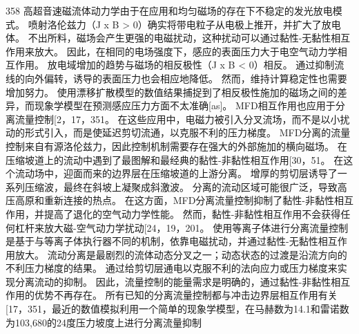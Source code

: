 \documentclass[UTF8,11pt,a4paper,openany,fontset=fandol]{ctexbook}
\begin{document}
358 高超音速磁流体动力学由于在应用和均匀磁场的存在下不稳定的发光放电模式。 喷射洛伦兹力（J x B > 0）确实将带电粒子从电极上推开，并扩大了放电体。 不出所料，磁场会产生更强的电磁扰动，这种扰动可以通过黏性-无黏性相互作用来放大。 因此，在相同的电场强度下，感应的表面压力大于电空气动力学相互作用。 放电域增加的趋势与磁场的相反极性（J x B < 0）相反。 通过抑制流线的向外偏转，诱导的表面压力也会相应地降低。 然而，维持计算稳定性也需要增加努力。 使用漂移扩散模型的数值结果捕捉到了相反极性施加的磁场之间的差异，而现象学模型在预测感应压力方面不太准确[as]。 MFD相互作用也应用于分离流量控制[2，17，351。 在这些应用中，电磁力被引入分叉流场，而不是以小扰动的形式引入，而是使延迟剪切流通，以克服不利的压力梯度。 MFD分离的流量控制来自有源洛伦兹力，因此控制机制需要存在强大的外部施加的横向磁场。 在压缩坡道上的流动中遇到了最图解和最经典的黏性-非黏性相互作用[30，51。 在这个流动场中，迎面而来的边界层在压缩坡道的上游分离。 增厚的剪切层诱导了一系列压缩波，最终在斜坡上凝聚成斜激波。 分离的流动区域可能很广泛，导致高压高原和重新连接的热点。 在这方面，MFD分离流量控制抑制了黏性-非黏性相互作用，并提高了退化的空气动力学性能。 然而，黏性-非黏性相互作用不会获得任何杠杆来放大磁-空气动力学扰动[24，19，201。 使用等离子体进行分离流量控制是基于与等离子体执行器不同的机制，依靠电磁扰动，并通过黏性-无黏性相互作用放大。 流动分离是最剧烈的流体动态分叉之一；动态状态的过渡是沿流方向的不利压力梯度的结果。 通过给剪切层通电以克服不利的法向应力或压力梯度来实现分离流动的抑制。 因此，流量控制的能量需求是明确的，通过黏性-非黏性相互作用的优势不再存在。 所有已知的分离流量控制都与冲击边界层相互作用有关[17，351，最近的数值模拟利用一个简单的现象学模型，在马赫数为14.1和雷诺数为103,680的24度压力坡度上进行分离流量抑制
\end{document}
